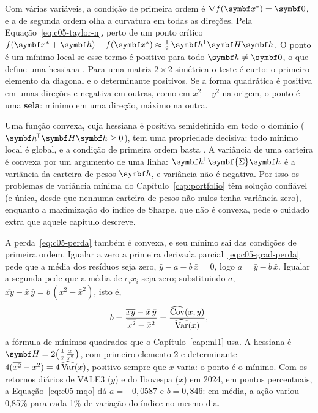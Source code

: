 Com várias variáveis, a condição de primeira ordem é $\nabla f(\vetor{x}^{\ast}) = \vetor{0}$, e a de segunda ordem olha a curvatura em todas as direções. Pela Equação~\eqref{eq:c05-taylor-n}, perto de um ponto crítico $f(\vetor{x}^{\ast} + \vetor{h}) - f(\vetor{x}^{\ast}) \approx \tfrac12\,\vetor{h}\T\vetor{H}\vetor{h}$. O ponto é um mínimo local se esse termo é positivo para todo $\vetor{h} \neq \vetor{0}$, o que define uma hessiana . Para uma matriz $2 \times 2$ simétrica o teste é curto: o primeiro elemento da diagonal e o determinante positivos. Se a forma quadrática é positiva em umas direções e negativa em outras, como em $x^2 - y^2$ na origem, o ponto é uma \textbf{sela}: mínimo em uma direção, máximo na outra.

Uma função convexa, cuja hessiana é positiva semidefinida em todo o domínio ($\vetor{h}\T\vetor{H}\vetor{h} \ge 0$), tem uma propriedade decisiva: todo mínimo local é global, e a condição de primeira ordem basta \citep{boyd2004}. A variância de uma carteira é convexa por um argumento de uma linha: $\vetor{h}\T\symbf{\Sigma}\vetor{h}$ é a variância da carteira de pesos $\vetor{h}$, e variância não é negativa. Por isso os problemas de variância mínima do Capítulo~\ref{cap:portfolio} têm solução confiável (e única, desde que nenhuma carteira de pesos não nulos tenha variância zero), enquanto a maximização do índice de Sharpe, que não é convexa, pede o cuidado extra que aquele capítulo descreve.

A perda~\eqref{eq:c05-perda} também é convexa, e seu mínimo sai das condições de primeira ordem. Igualar a zero a primeira derivada parcial~\eqref{eq:c05-grad-perda} pede que a média dos resíduos seja zero, $\bar y - a - b\,\bar x = 0$, logo $a = \bar y - b\,\bar x$. Igualar a segunda pede que a média de $e_i x_i$ seja zero; substituindo $a$, $\overline{xy} - \bar x\,\bar y = b\,(\overline{x^2} - \bar x^2)$, isto é,
\begin{equation}
  b = \frac{\overline{xy} - \bar x\,\bar y}{\overline{x^2} - \bar x^2} = \frac{\widehat{\operatorname{Cov}}(x, y)}{\widehat{\operatorname{Var}}(x)} ,
  \label{eq:c05-mqo}
\end{equation}
a fórmula de mínimos quadrados que o Capítulo~\ref{cap:ml1} usa. A hessiana é $\vetor{H} = 2\begin{psmallmatrix} 1 & \bar x \\ \bar x & \overline{x^2} \end{psmallmatrix}$, com primeiro elemento 2 e determinante $4(\overline{x^2} - \bar x^2) = 4\,\widehat{\operatorname{Var}}(x)$, positivo sempre que $x$ varia: o ponto é o mínimo. Com os retornos diários de VALE3 ($y$) e do Ibovespa ($x$) em 2024, em pontos percentuais, a Equação~\eqref{eq:c05-mqo} dá $a = -0,0587$ e $b = 0,846$: em média, a ação variou 0,85\% para cada 1\% de variação do índice no mesmo dia.

